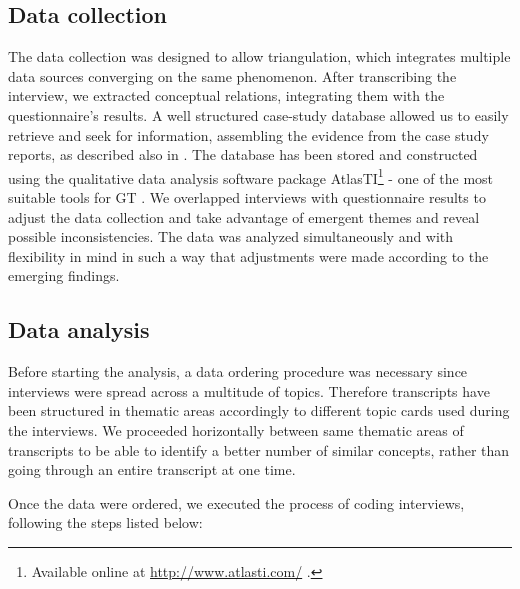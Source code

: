 \documentclass[10pt,journal,letterpaper,compsoc]{IEEEtran}
\begin{document}
\subsection{Data collection}
The data collection was designed to allow triangulation, which integrates multiple data sources converging on the same phenomenon. After transcribing the interview, we extracted conceptual relations, integrating them with the questionnaire's results. A well structured case-study database allowed us to easily retrieve and seek for information, assembling the evidence from the case study reports, as described also in \cite{Yin1994}. The database has been stored and constructed using the qualitative data analysis software package AtlasTI\footnote{Available online at \url{http://www.atlasti.com/} .} - one of the most suitable tools for GT \cite{Coleman2007}. 
We overlapped interviews with questionnaire results to adjust the data collection and take advantage of emergent themes and reveal possible inconsistencies. The data was analyzed simultaneously and with flexibility in mind in such a way that adjustments were made according to the emerging findings.
\subsection{Data analysis}
Before starting the analysis, a data ordering procedure was necessary since interviews were spread across a multitude of topics. Therefore transcripts have been structured in thematic areas accordingly to different topic cards used during the interviews. We proceeded horizontally between same thematic areas of transcripts to be able to identify a better number of similar concepts, rather than going through an entire transcript at one time.

Once the data were ordered, we executed the process of coding interviews, following the steps listed below: 
\end{document}
